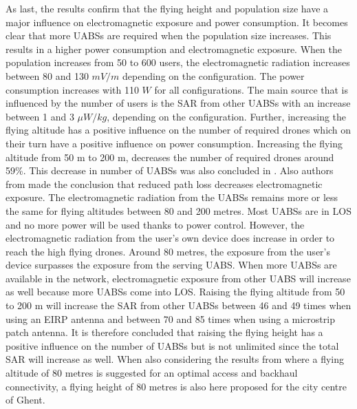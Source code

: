 As last, the results confirm that the flying height and population size have a major influence on electromagnetic exposure and 
power consumption. It becomes clear that more \gls{UABS}s are required when the population size increases. 
This results in a higher power 
consumption and electromagnetic exposure. When the population increases from 50 to 600 users, 
the electromagnetic radiation increases between 80 and 130 $mV/m$ depending
on the configuration. The power consumption increases with 110 $W$ for all configurations. 
The main source that is influenced by the number of users is the \gls{SAR} from other UABSs with an increase between 1 and 3 $\mu W/kg$, depending on 
the configuration.
Further, increasing the flying altitude has a positive influence on the number of required drones which on their 
turn have a positive influence on power consumption. Increasing the flying altitude from 50 m to 200 m, decreases the number 
of required drones around 59\%. This decrease in number of \gls{UABS}s was also concluded in \cite{J2}.
Also authors from \cite{J17_kuehn2019modelling} made the conclusion that reduced path loss decreases electromagnetic exposure.
The electromagnetic radiation from the \gls{UABS}s remains more or less the same for flying altitudes between 80 and 200 metres. Most 
\gls{UABS}s are in \gls{LOS} and no more power will be used thanks to power control.
However, the electromagnetic radiation from the user's own device does increase in order to reach the high flying drones.
Around 80 metres, the exposure from the  user's device surpasses the exposure from the serving \gls{UABS}.
When more \gls{UABS}s are available in the network, electromagnetic exposure from other \gls{UABS} will increase as well 
because more \gls{UABS}s come into \gls{LOS}. Raising the flying altitude from 50 to 200 m will increase the \gls{SAR} from other 
\gls{UABS}s between 46 and 49 times when using an \gls{EIRP} antenna and between 70 and 85 times when using a microstrip patch antenna.
It is therefore concluded that raising the flying height has a positive influence on the number of 
\gls{UABS}s but is not unlimited since the total \gls{SAR} will increase as well.
When also considering the results from \cite{U1} where a flying altitude of  
80 metres is suggested for an optimal access and backhaul connectivity, a flying height 
of 80 metres is also here proposed for the city centre of Ghent.

